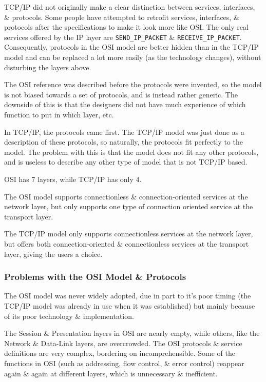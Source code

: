 \documentclass[11pt]{article}
\begin{document}
TCP/IP did not originally make a clear distinction between services, interfaces, \& protocols. 
Some people have attempted to retrofit services, interfaces, \& protocols after the specifications to make it look more like 
OSI. 
The only real services offered by the IP layer are \verb|SEND_IP_PACKET| \& \verb|RECEIVE_IP_PACKET|. 
Consequently, protocols in the OSI model are better hidden than in the TCP/IP model and can be replaced a lot more easily (as 
the technology changes), without disturbing the layers above. 

The OSI reference was described before the protocols were invented, so the model is not biased towards a set of protocols, and 
is instead rather generic. 
The downside of this is that the designers did not have much experience of which function to put in which layer, etc. 

In TCP/IP, the protocols came first. 
The TCP/IP model was just done as a description of these protocols, so naturally, the protocols fit perfectly to the model. 
The problem with this is that the model does not fit any other protocols, and is useless to describe any other type of model 
that is not TCP/IP based. 

OSI has 7 layers, while TCP/IP has only 4. 

The OSI model supports connectionless \& connection-oriented services at the network layer, but only supports one type of 
connection oriented service at the transport layer. 

The TCP/IP model only supports connectionless services at the network layer, but offers both connection-oriented \& connectionless 
services at the transport layer, giving the users a choice. 

\subsubsection{Problems with the OSI Model \& Protocols} 
The OSI model was never widely adopted, due in part to it's poor timing (the TCP/IP model was already in use when it was established) 
but mainly because of its poor technology \& implementation. 

The Session \& Presentation layers in OSI are nearly empty, while others, like the Network \& Data-Link layers, are overcrowded. 
The OSI protocols \& service definitions are very complex, bordering on incomprehensible. 
Some of the functions in OSI (such as addressing, flow control, \& error control) reappear again \& again at different layers, 
which is unnecessary \& inefficient. 
\end{document}
